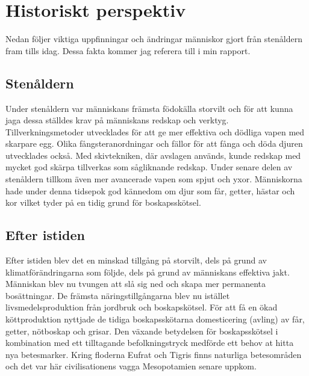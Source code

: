 \section{Historiskt perspektiv}
Nedan följer viktiga uppfinningar och ändringar människor gjort från stenåldern fram tills idag. Dessa fakta kommer jag referera till i min rapport. 
 
\subsection{Stenåldern}
Under stenåldern var människans främsta födokälla storvilt och för att kunna jaga dessa ställdes krav på människans redskap och verktyg. Tillverkningsmetoder utvecklades för att ge mer effektiva och dödliga vapen med skarpare egg. Olika fångsteranordningar och fällor för att fånga och döda djuren utvecklades också. Med skivtekniken, där avslagen används, kunde redskap med mycket god skärpa tillverkas som sågliknande redskap. Under senare delen av stenåldern tillkom även mer avancerade vapen som spjut och yxor. \citep{denskapande} 
\newline
\newline
Människorna hade under denna tidsepok god kännedom om djur som får, getter, hästar och kor vilket tyder på en tidig grund för boskapsskötsel. \citep{denskapande}
     
\subsection{Efter istiden}
Efter istiden blev det en minskad tillgång på storvilt, dels på grund av klimatförändringarna som följde, dels på grund av människans effektiva jakt. Människan blev nu tvungen att slå sig ned och skapa mer permanenta bosättningar. De främsta näringstillgångarna blev nu istället livsmedelsproduktion från jordbruk och boskapskötsel. För att få en ökad köttproduktion nyttjade de tidiga boskapsskötarna domesticering (avling) av får, getter, nötboskap och grisar. \citep{denskapande}
\newline
\newline
Den växande betydelsen för boskapsskötsel i kombination med ett tilltagande befolkningstryck medförde ett behov at hitta nya betesmarker. Kring floderna Eufrat och Tigris finns naturliga betesområden och det var här civilisationens vagga Mesopotamien senare uppkom. \citep{denskapande}   

